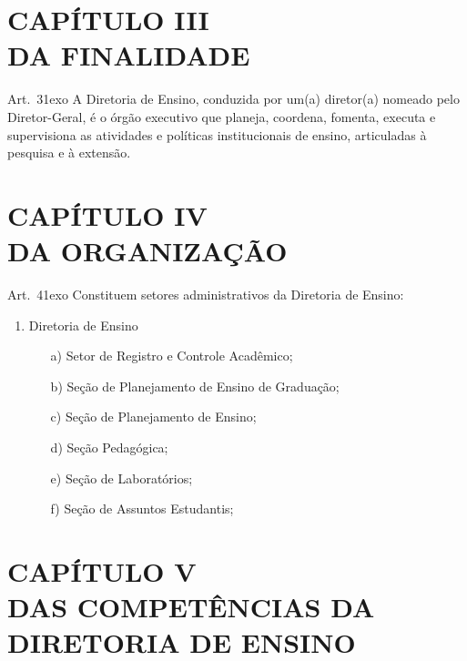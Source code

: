 \documentclass[a4paper,12pt]{report}
\newcommand{\ORD}[2]{#1\raise1ex\hbox{\scriptsize#2}}
\begin{document}
\section{CAPÍTULO III \\ DA FINALIDADE}

Art.~\ORD{3}{o} A Diretoria de Ensino, conduzida por um(a) diretor(a) nomeado pelo 
Diretor-Geral, é o órgão executivo que planeja, coordena, fomenta, executa e supervisiona 
as atividades e políticas institucionais de ensino, articuladas à pesquisa e à extensão.


\section{CAPÍTULO IV \\ DA ORGANIZAÇÃO}

Art.~\ORD{4}{o} Constituem setores administrativos da Diretoria de Ensino:

\begin{enumerate}
	\renewcommand{\labelenumi}{\Roman{enumi}}
	
	\item Diretoria de Ensino
	
	\begin{enumerate}
		\item[a)] Setor de Registro e Controle Acadêmico;
		\item[b)] Seção de Planejamento de Ensino de Graduação;
		\item[c)] Seção de Planejamento de Ensino;
		\item[d)] Seção Pedagógica;
		\item[e)] Seção de Laboratórios;
		\item[f)] Seção de Assuntos Estudantis;
	\end{enumerate}   
\end{enumerate}


\section{CAPÍTULO V \\ DAS COMPETÊNCIAS DA DIRETORIA DE ENSINO}
\end{document}
